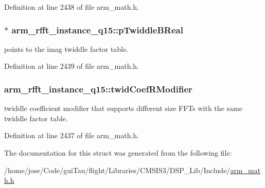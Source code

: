 Definition at line 2438 of file arm\-\_\-math.\-h.

\hypertarget{structarm__rfft__instance__q15_a937d815022adc557b435ba8c6cd58b0d}{
\subsubsection[{p\-Twiddle\-B\-Real}]{$\ast$ arm\-\_\-rfft\-\_\-instance\-\_\-q15\-::p\-Twiddle\-B\-Real}}\label{structarm__rfft__instance__q15_a937d815022adc557b435ba8c6cd58b0d}
points to the imag twiddle factor table. 

Definition at line 2439 of file arm\-\_\-math.\-h.

\hypertarget{structarm__rfft__instance__q15_afd444d05858c5f419980e94e8240d5c3}{
\subsubsection[{twid\-Coef\-R\-Modifier}]{ arm\-\_\-rfft\-\_\-instance\-\_\-q15\-::twid\-Coef\-R\-Modifier}}\label{structarm__rfft__instance__q15_afd444d05858c5f419980e94e8240d5c3}
twiddle coefficient modifier that supports different size F\-F\-Ts with the same twiddle factor table. 

Definition at line 2437 of file arm\-\_\-math.\-h.



The documentation for this struct was generated from the following file\-:\begin{DoxyCompactItemize}
\item 
/home/jose/\-Code/gui\-Tau/flight/\-Libraries/\-C\-M\-S\-I\-S3/\-D\-S\-P\-\_\-\-Lib/\-Include/\hyperlink{arm__math_8h}{arm\-\_\-math.\-h}\end{DoxyCompactItemize}
